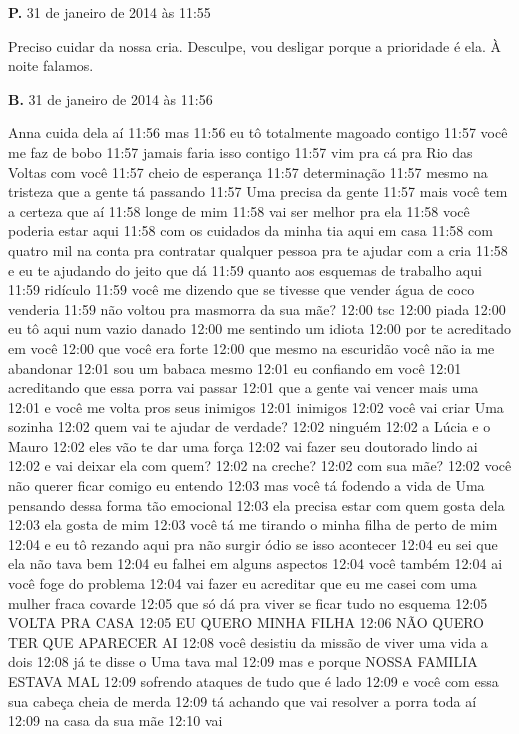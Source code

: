\textbf{P.} 31 de janeiro de 2014 às 11:55

Preciso cuidar da nossa cria. Desculpe, vou desligar porque a prioridade
é ela. À noite falamos.

\textbf{B.} 31 de janeiro de 2014 às 11:56

Anna cuida dela aí 11:56 mas 11:56 eu tô totalmente magoado contigo
11:57 você me faz de bobo 11:57 jamais faria isso contigo 11:57 vim pra
cá pra Rio das Voltas com você 11:57 cheio de esperança 11:57
determinação 11:57 mesmo na tristeza que a gente tá passando 11:57 Uma
precisa da gente 11:57 mais você tem a certeza que aí 11:58 longe de mim
11:58 vai ser melhor pra ela 11:58 você poderia estar aqui 11:58 com os
cuidados da minha tia aqui em casa 11:58 com quatro mil na conta pra
contratar qualquer pessoa pra te ajudar com a cria 11:58 e eu te
ajudando do jeito que dá 11:59 quanto aos esquemas de trabalho aqui
11:59 ridículo 11:59 você me dizendo que se tivesse que vender água de
coco venderia 11:59 não voltou pra masmorra da sua mãe? 12:00 tsc 12:00
piada 12:00 eu tô aqui num vazio danado 12:00 me sentindo um idiota
12:00 por te acreditado em você 12:00 que você era forte 12:00 que mesmo
na escuridão você não ia me abandonar 12:01 sou um babaca mesmo 12:01 eu
confiando em você 12:01 acreditando que essa porra vai passar 12:01 que
a gente vai vencer mais uma 12:01 e você me volta pros seus inimigos
12:01 inimigos 12:02 você vai criar Uma sozinha 12:02 quem vai te ajudar
de verdade? 12:02 ninguém 12:02 a Lúcia e o Mauro 12:02 eles vão te dar
uma força 12:02 vai fazer seu doutorado lindo ai 12:02 e vai deixar ela
com quem? 12:02 na creche? 12:02 com sua mãe? 12:02 você não querer
ficar comigo eu entendo 12:03 mas você tá fodendo a vida de Uma pensando
dessa forma tão emocional 12:03 ela precisa estar com quem gosta dela
12:03 ela gosta de mim 12:03 você tá me tirando o minha filha de perto
de mim 12:04 e eu tô rezando aqui pra não surgir ódio se isso acontecer
12:04 eu sei que ela não tava bem 12:04 eu falhei em alguns aspectos
12:04 você também 12:04 ai você foge do problema 12:04 vai fazer eu
acreditar que eu me casei com uma mulher fraca covarde 12:05 que só dá
pra viver se ficar tudo no esquema 12:05 VOLTA PRA CASA 12:05 EU QUERO
MINHA FILHA 12:06 NÃO QUERO TER QUE APARECER AI 12:08 você desistiu da
missão de viver uma vida a dois 12:08 já te disse o Uma tava mal 12:09
mas e porque NOSSA FAMILIA ESTAVA MAL 12:09 sofrendo ataques de tudo que
é lado 12:09 e você com essa sua cabeça cheia de merda 12:09 tá achando
que vai resolver a porra toda aí 12:09 na casa da sua mãe 12:10 vai
